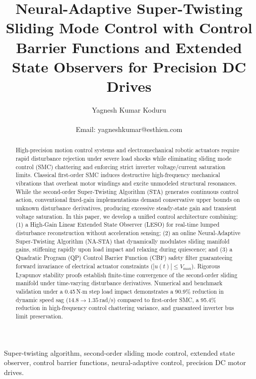 \documentclass[journal,twocolumn,letterpaper]{IEEEtran}
\begin{document}
\title{Neural-Adaptive Super-Twisting Sliding Mode Control with Control Barrier Functions and Extended State Observers for Precision DC Drives}

\author{Yagnesh Kumar Koduru\\
\\
Email: yagneshkumar@esthien.com}

\maketitle

\begin{abstract}
High-precision motion control systems and electromechanical robotic actuators require rapid disturbance rejection under severe load shocks while eliminating sliding mode control (SMC) chattering and enforcing strict inverter voltage/current saturation limits. Classical first-order SMC induces destructive high-frequency mechanical vibrations that overheat motor windings and excite unmodeled structural resonances. While the second-order Super-Twisting Algorithm (STA) generates continuous control action, conventional fixed-gain implementations demand conservative upper bounds on unknown disturbance derivatives, producing excessive steady-state gain and transient voltage saturation. In this paper, we develop a unified control architecture combining: (1) a High-Gain Linear Extended State Observer (LESO) for real-time lumped disturbance reconstruction without acceleration sensing; (2) an online Neural-Adaptive Super-Twisting Algorithm (NA-STA) that dynamically modulates sliding manifold gains, stiffening rapidly upon load impact and relaxing during quiescence; and (3) a Quadratic Program (QP) Control Barrier Function (CBF) safety filter guaranteeing forward invariance of electrical actuator constraints ($|u(t)| \le V_{\max}$). Rigorous Lyapunov stability proofs establish finite-time convergence of the second-order sliding manifold under time-varying disturbance derivatives. Numerical and benchmark validation under a 0.45\,N$\cdot$m step load impact demonstrates a 90.9\% reduction in dynamic speed sag ($14.8 \to 1.35$\,rad/s) compared to first-order SMC, a 95.4\% reduction in high-frequency control chattering variance, and guaranteed inverter bus limit preservation.
\end{abstract}

\begin{IEEEkeywords}
Super-twisting algorithm, second-order sliding mode control, extended state observer, control barrier functions, neural-adaptive control, precision DC motor drives.
\end{IEEEkeywords}
\end{document}
